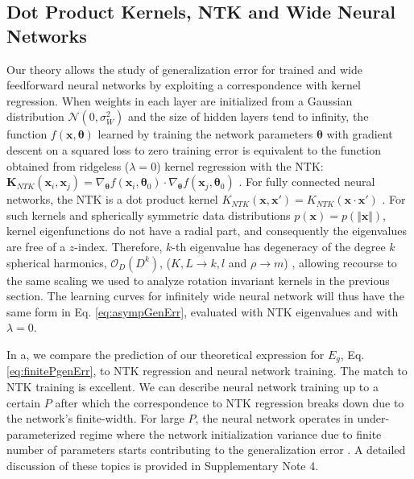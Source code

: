 \documentclass[11pt]{article}
\begin{document}
	
\subsection*{Dot Product Kernels, NTK and Wide Neural Networks} 

Our theory allows the study of generalization error for trained and wide feedforward neural networks by exploiting a correspondence with kernel regression. When weights in each layer are initialized from a Gaussian distribution $\mathcal{N}(0,\sigma^2_W)$ and the size of hidden layers tend to infinity, the function $f(\mathbf{x},\bm{\theta})$ learned by training the network parameters $\bm{\theta}$ with gradient descent on a squared loss to zero training error is equivalent to the function obtained from ridgeless ($\lambda=0$) kernel regression with the NTK: $ \mathbf{K}_{NTK} (\mathbf{x}_i, \mathbf{x}_j) =  \nabla_{\bm{\theta}} f(\mathbf{x}_i, \bm{\theta}_0) \cdot \nabla_{\bm{\theta}} f(\mathbf{x}_j, \bm{\theta}_0)$ \cite{jacot2018neural}. For fully connected neural networks, the NTK is a dot product kernel $K_{NTK}(\mathbf{x}, \mathbf{x}') = K_{NTK}(\mathbf{x}\cdot  \mathbf{x}')$ \cite{jacot2018neural,bordelon2020spectrum}. For such kernels and spherically symmetric data distributions $p(\mathbf{x})=p(\Vert\mathbf{x}\Vert)$, kernel eigenfunctions do not have a radial part, and consequently the eigenvalues are free of a $z$-index. Therefore, $k$-th eigenvalue has degeneracy of the degree $k$ spherical harmonics, $\mathcal{O}_D(D^k)$, ($K,L\to k,l$ and $\rho \to m$) \cite{bordelon2020spectrum}, allowing recourse to the same scaling we used to analyze rotation invariant kernels in the previous section. The learning curves for infinitely wide neural network will thus have the same form in  Eq. \eqref{eq:asympGenErr}, evaluated with NTK eigenvalues and with $\lambda = 0$.

In a, we compare the prediction of our theoretical expression for $E_g$, Eq. \eqref{eq:finitePgenErr}, to NTK regression and neural network training. The match to NTK training is excellent. We can describe neural network training up to a certain $P$ after which the correspondence to NTK regression breaks down due to the network's finite-width. For large $P$, the neural network operates in under-parameterized regime where the network initialization variance due to finite number of parameters starts contributing to the generalization error \cite{belkin2019reconciling, montanari2019generalization, montanari2019surprises, dascoli2020double}. A detailed discussion of these topics is provided in Supplementary Note 4.
	
\end{document}

